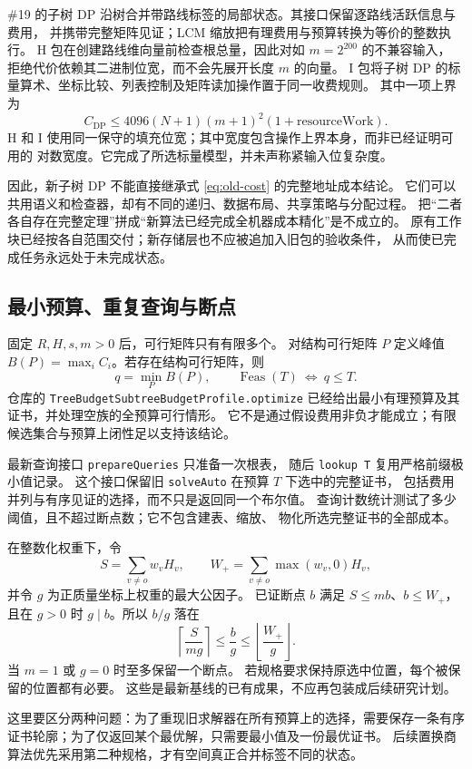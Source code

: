\documentclass[UTF8,a4paper,11pt,fontset=fandol]{ctexart}
\theoremstyle{definition}
\newcommand{\Feas}{\operatorname{Feas}}
\newcommand{\repo}[1]{\nolinkurl{#1}}
\begin{document}
\#19 的子树 DP 沿树合并带路线标签的局部状态。其接口保留逐路线活跃信息与费用，
并携带完整矩阵见证；LCM 缩放把有理费用与预算转换为等价的整数执行。
H 包在创建路线维向量前检查根总量，因此对如 $m=2^{200}$ 的不兼容输入，
拒绝代价依赖其二进制位宽，而不会先展开长度 $m$ 的向量。
I 包将子树 DP 的标量算术、坐标比较、列表控制及矩阵读加操作置于同一收费规则。
其中一项上界为
\[
C_{\mathrm{DP}}\le
4096(N+1)(m+1)^2(1+\mathrm{resourceWork}).
\]
H 和 I 使用同一保守的填充位宽；其中宽度包含操作上界本身，而非已经证明可用的
对数宽度。它完成了所选标量模型，并未声称紧输入位复杂度。

因此，新子树 DP 不能直接继承式 \eqref{eq:old-cost} 的完整地址成本结论。
它们可以共用语义和检查器，却有不同的递归、数据布局、共享策略与分配过程。
把“二者各自存在完整定理”拼成“新算法已经完成全机器成本精化”是不成立的。
原有工作块已经按各自范围交付；新存储层也不应被追加入旧包的验收条件，
从而使已完成任务永远处于未完成状态。

\subsection{最小预算、重复查询与断点}

固定 $R,H,s,m>0$ 后，可行矩阵只有有限多个。
对结构可行矩阵 $P$ 定义峰值
$B(P)=\max_i C_i$。若存在结构可行矩阵，则
\[
q=\min_P B(P),\qquad
\Feas(T)\ \Longleftrightarrow\ q\le T.
\]
仓库的 \repo{TreeBudgetSubtreeBudgetProfile.optimize}
已经给出最小有理预算及其证书，并处理空族的全预算可行情形。
它不是通过假设费用非负才能成立；有限候选集合与预算上闭性足以支持该结论。

最新查询接口 \repo{prepareQueries} 只准备一次根表，
随后 \repo{lookup T} 复用严格前缀极小值记录。
这个接口保留旧 \repo{solveAuto} 在预算 $T$ 下选中的完整证书，
包括费用并列与有序见证的选择，而不只是返回同一个布尔值。
查询计数统计测试了多少阈值，且不超过断点数；它不包含建表、缩放、
物化所选完整证书的全部成本。

在整数化权重下，令
\[
S=\sum_{v\neq o}w_vH_v,\qquad
W_+=\sum_{v\neq o}\max(w_v,0)H_v,
\]
并令 $g$ 为正质量坐标上权重的最大公因子。
已证断点 $b$ 满足 $S\le mb$、$b\le W_+$，
且在 $g>0$ 时 $g\mid b$。所以 $b/g$ 落在
\[
\left\lceil\frac{S}{mg}\right\rceil
\le \frac bg\le
\left\lfloor\frac{W_+}{g}\right\rfloor.
\]
当 $m=1$ 或 $g=0$ 时至多保留一个断点。
若规格要求保持原选中位置，每个被保留的位置都有必要。
这些是最新基线的已有成果，不应再包装成后续研究计划。

这里要区分两种问题：为了重现旧求解器在所有预算上的选择，需要保存一条有序
证书轮廓；为了仅返回某个最优解，只需要最小值及一份最优证书。
后续置换商算法优先采用第二种规格，才有空间真正合并标签不同的状态。
\end{document}
